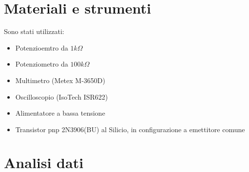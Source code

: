 \documentclass{article}
\begin{document}
\section{Materiali e strumenti}
Sono stati utilizzati:
\begin{itemize}
    \item Potenzioemtro da $1 k\Omega$
    \item Potenziometro da $100 k\Omega$
    \item Multimetro (Metex M-3650D)
    \item Oscilloscopio (IsoTech ISR622)
    \item Alimentatore a bassa tensione
    \item Transistor pnp 2N3906(BU) al Silicio, in configurazione a emettitore comune
\end{itemize}


\newpage
\section{Analisi dati}
\end{document}
